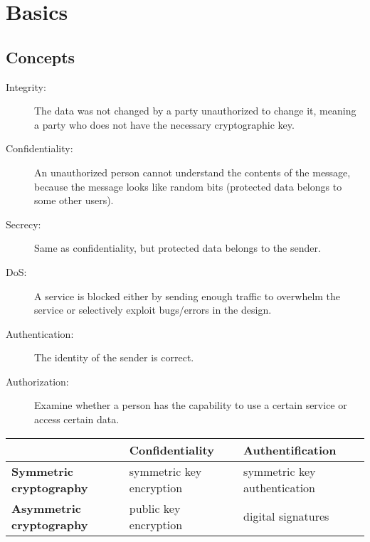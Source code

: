 
\section{Basics}
\subsection{Concepts}
\begin{description}
  \item[Integrity:] The data was not changed by a party unauthorized to change it, meaning
    a party who does not have the necessary cryptographic key.
  \item[Confidentiality:] An unauthorized person cannot understand the contents of the
    message, because the message looks like random bits (protected data belongs to
    some other users).
  \item[Secrecy:] Same as confidentiality, but protected data belongs to the
    sender.
  \item[DoS:] A service is blocked either by sending enough traffic to overwhelm the service
    or selectively exploit bugs/errors in the design.
  \item[Authentication:] The identity of the sender is correct.
  \item[Authorization:] Examine whether a person has the capability to use
    a certain service or access certain data.
\end{description}

\begin{tabular}{p{2.2cm}p{2.5cm}p{2.5cm}}
  \hline
	& 	\textbf{Confidentiality} & \textbf{Authentification}\\
	\hline
	\hline
  \textbf{Symmetric cryptography} & symmetric key encryption & symmetric
  key authentication\\
  \hline
  \textbf{Asymmetric cryptography} & public key encryption & digital signatures\\
  \hline
\end{tabular}
